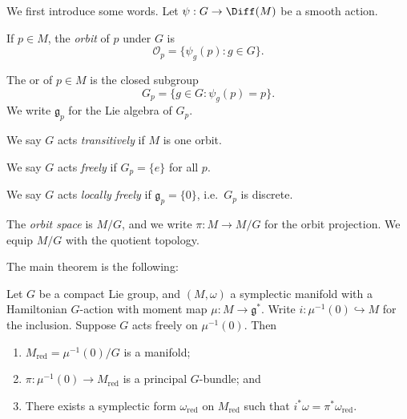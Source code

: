\documentclass[a4paper]{article}
\newcommand\red{\mathrm{red}}
\begin{document}
We first introduce some words. Let $\psi: G \to \Diff(M)$ be a smooth action.
\begin{defi}[Orbit]
  If $p \in M$, the \emph{orbit} of $p$ under $G$ is
  \[
    \mathcal{O}_p = \{\psi_g(p): g \in G\}.
  \]
\end{defi}

\begin{defi}[Stabilizer]
  The  or  of $p \in M$ is the closed subgroup
  \[
    G_p = \{g \in G: \psi_g(p) = p\}.
  \]
  We write $\mathfrak{g}_p$ for the Lie algebra of $G_p$.
\end{defi}

\begin{defi}
  We say $G$ acts \emph{transitively} if $M$ is one orbit.
\end{defi}

\begin{defi}
  We say $G$ acts \emph{freely} if $G_p = \{e\}$ for all $p$.
\end{defi}

\begin{defi}
  We say $G$ acts \emph{locally freely} if $\mathfrak{g}_p = \{0\}$, i.e.\ $G_p$ is discrete.
\end{defi}

\begin{defi}
  The \emph{orbit space} is $M/G$, and we write $\pi: M \to M/G$ for the orbit projection. We equip $M/G$ with the quotient topology.
\end{defi}

The main theorem is the following:
\begin{thm}
  Let $G$ be a compact Lie group, and $(M, \omega)$ a symplectic manifold with a Hamiltonian $G$-action with moment map $\mu: M \to \mathfrak{g}^*$. Write $i: \mu^{-1}(0) \hookrightarrow M$ for the inclusion. Suppose $G$ acts freely on $\mu^{-1}(0)$. Then
  \begin{enumerate}
    \item $M_{\red} = \mu^{-1}(0)/G$ is a manifold;
    \item $\pi: \mu^{-1}(0) \to M_{\red}$ is a principal $G$-bundle; and
    \item There exists a symplectic form $\omega_{\red}$ on $M_{\red}$ such that $i^*\omega = \pi^* \omega_{\red}$.
  \end{enumerate}
\end{thm}
\end{document}

